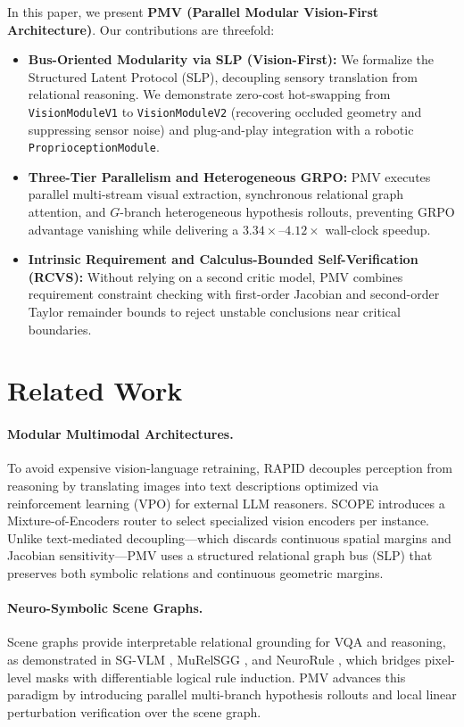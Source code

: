 \documentclass[10pt,twocolumn]{article}
\begin{document}
In this paper, we present \textbf{PMV (Parallel Modular Vision-First Architecture)}. Our contributions are threefold:
\begin{itemize}
    \item \textbf{Bus-Oriented Modularity via SLP (Vision-First):} We formalize the Structured Latent Protocol (SLP), decoupling sensory translation from relational reasoning. We demonstrate zero-cost hot-swapping from \texttt{VisionModuleV1} to \texttt{VisionModuleV2} (recovering occluded geometry and suppressing sensor noise) and plug-and-play integration with a robotic \texttt{ProprioceptionModule}.
    \item \textbf{Three-Tier Parallelism and Heterogeneous GRPO:} PMV executes parallel multi-stream visual extraction, synchronous relational graph attention, and $G$-branch heterogeneous hypothesis rollouts, preventing GRPO advantage vanishing while delivering a $3.34\times$--$4.12\times$ wall-clock speedup.
    \item \textbf{Intrinsic Requirement and Calculus-Bounded Self-Verification (RCVS):} Without relying on a second critic model, PMV combines requirement constraint checking with first-order Jacobian and second-order Taylor remainder bounds to reject unstable conclusions near critical boundaries.
\end{itemize}

\section{Related Work}
\paragraph{Modular Multimodal Architectures.}
To avoid expensive vision-language retraining, RAPID \cite{rapid2025} decouples perception from reasoning by translating images into text descriptions optimized via reinforcement learning (VPO) for external LLM reasoners. SCOPE \cite{scope2025} introduces a Mixture-of-Encoders router to select specialized vision encoders per instance. Unlike text-mediated decoupling—which discards continuous spatial margins and Jacobian sensitivity—PMV uses a structured relational graph bus (SLP) that preserves both symbolic relations and continuous geometric margins.

\paragraph{Neuro-Symbolic Scene Graphs.}
Scene graphs provide interpretable relational grounding for VQA and reasoning, as demonstrated in SG-VLM \cite{sgvlm2025}, MuRelSGG \cite{murelsgg2025}, and NeuroRule \cite{neurorule2026}, which bridges pixel-level masks with differentiable logical rule induction. PMV advances this paradigm by introducing parallel multi-branch hypothesis rollouts and local linear perturbation verification over the scene graph.
\end{document}
